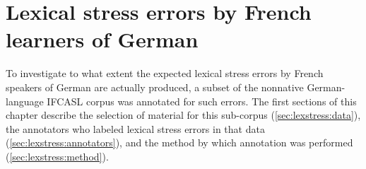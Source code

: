 %
%
\chapter{Lexical stress errors by French learners of German}
\label{chap:lexstress}



%	
	



	To investigate to what extent the expected lexical stress errors by French speakers of German are actually produced, a subset of the nonnative German-language IFCASL corpus was annotated for such errors.
%
	The first sections of this chapter describe the selection of material for this sub-corpus (\cref{sec:lexstress:data}), the annotators who labeled lexical stress errors in that data (\cref{sec:lexstress:annotators}), and the method by which annotation was performed (\cref{sec:lexstress:method}). 
	
